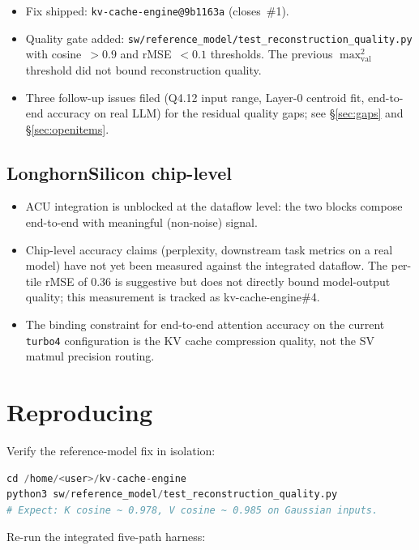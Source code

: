 \documentclass[11pt]{article}
\begin{document}
\begin{itemize}
\item Fix shipped: \texttt{kv-cache-engine@9b1163a}
(closes~\#1).
\item Quality gate added:
\texttt{sw/reference\_model/test\_reconstruction\_quality.py}
with cosine~$> 0.9$ and rMSE~$< 0.1$ thresholds. The previous
$\max_{\mathrm{val}}^2$ threshold did not bound reconstruction
quality.
\item Three follow-up issues filed (Q4.12 input range, Layer-0
centroid fit, end-to-end accuracy on real LLM) for the residual
quality gaps; see \S\ref{sec:gaps} and \S\ref{sec:openitems}.
\end{itemize}

\subsection{LonghornSilicon chip-level}
\label{sec:impl-chip}

\begin{itemize}
\item ACU integration is unblocked at the dataflow level: the two
blocks compose end-to-end with meaningful (non-noise) signal.
\item Chip-level accuracy claims (perplexity, downstream task
metrics on a real model) have not yet been measured against the
integrated dataflow. The per-tile rMSE of $0.36$ is suggestive
but does not directly bound model-output quality; this measurement
is tracked as kv-cache-engine\#4.
\item The binding constraint for end-to-end attention accuracy
on the current \texttt{turbo4} configuration is the KV cache
compression quality, not the SV matmul precision routing.
\end{itemize}

\section{Reproducing}
\label{sec:reproduction}

Verify the reference-model fix in isolation:

\begin{lstlisting}[language=Python,basicstyle=\ttfamily\small]
cd /home/<user>/kv-cache-engine
python3 sw/reference_model/test_reconstruction_quality.py
# Expect: K cosine ~ 0.978, V cosine ~ 0.985 on Gaussian inputs.
\end{lstlisting}

Re-run the integrated five-path harness:
\end{document}
